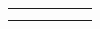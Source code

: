 {\begin{center}
\begin{xtabular*}{\mytablewidth}[t]{|p{10\mystarwidth}|p{10\mystarwidth}|p{10\mystarwidth}|p{10\mystarwidth}|p{10\mystarwidth}|p{10\mystarwidth}|}
    
         &
    
    
         &
    
    
     \tabularnewline{}
    
    
         &
    
    
         &
    
    
         &
    
    
         &
    
    
         &
    
    
     \tabularnewline{}
    

\end{xtabular*}
\end{center}}
